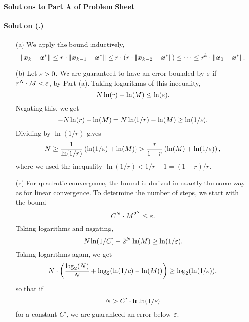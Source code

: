 \documentclass{article}
\newcounter{problemSheetNumber}
\newcounter{problems}
\renewcommand{\solution}[1]{\paragraph{Solution (\theproblemSheetNumber.\theproblems)}\addtocounter{problems}{1}\label{#1}}
\begin{document}
 
\begin{center}
{\Large {\bf Solutions to Part A of Problem Sheet \theproblemSheetNumber}}
\end{center}

\solution{pr:4}
\begin{itemize}
 \item[(a)] We apply the bound inductively,
 \begin{equation*}
  \Vert {\bm{x}_k-\bm{x}^*}\Vert\leq r\cdot \Vert {\bm{x}_{k-1}-\bm{x}^*}\Vert\leq r \cdot (r \cdot  \Vert {\bm{x}_{k-2}-\bm{x}^*}\Vert)\leq \cdots \leq r^k\cdot \Vert {\bm{x}_{0}-\bm{x}^*}\Vert.
 \end{equation*}
\item[(b)] Let $\varepsilon>0$. We are guaranteed to have an error bounded by $\varepsilon$ if $r^N\cdot M<\varepsilon$, by Part (a).
Taking logarithms of this inequality,
\begin{equation*}
 N\ln(r) + \ln(M)\leq \ln(\varepsilon).
\end{equation*}
Negating this, we get
\begin{equation*}
 -N\ln(r) - \ln(M)=N\ln(1/r) - \ln(M)\geq \ln(1/\varepsilon).
\end{equation*}
Dividing by $\ln(1/r)$ gives
\begin{equation*}
 N  \geq \frac{1}{\ln(1/r)} \left(\ln(1/\varepsilon)+\ln(M)\right) > \frac{r}{1-r}\left(\ln(M)+\ln(1/\varepsilon)\right),
\end{equation*}
where we used the inequality $\ln(1/r)<1/r-1 = (1-r)/r$. 
\item[(c)] For quadratic convergence, the bound is derived in exactly the same way as for linear convergence. To determine the number of steps, we start with the bound
\begin{equation*}
 C^N\cdot M^{2^N}\leq \varepsilon.
\end{equation*}
Taking logarithms and negating,
\begin{equation*}
 N\ln(1/C)-2^N\ln(M) \geq \ln(1/\varepsilon).
\end{equation*}
Taking logarithms again, we get
\begin{equation*}
 N\cdot \left(\frac{\log_2(N)}{N}+\log_2(\ln(1/c)-\ln(M))\right) \geq \log_2 (\ln(1/\varepsilon)),
\end{equation*}
so that if 
\begin{equation*}
 N> C'\cdot \ln\ln(1/\varepsilon)
\end{equation*}
for a constant $C'$, we are guaranteed an error below $\varepsilon$.

\end{itemize}
\end{document}
